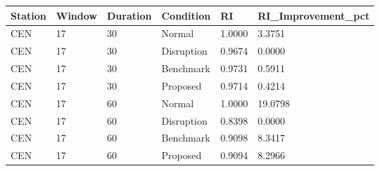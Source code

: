 \begin{tabular}{llllll}
\toprule
Station & Window & Duration & Condition & RI & RI\_Improvement\_pct \\
\midrule
CEN & 17 & 30 & Normal & 1.0000 & 3.3751 \\
CEN & 17 & 30 & Disruption & 0.9674 & 0.0000 \\
CEN & 17 & 30 & Benchmark & 0.9731 & 0.5911 \\
CEN & 17 & 30 & Proposed & 0.9714 & 0.4214 \\
CEN & 17 & 60 & Normal & 1.0000 & 19.0798 \\
CEN & 17 & 60 & Disruption & 0.8398 & 0.0000 \\
CEN & 17 & 60 & Benchmark & 0.9098 & 8.3417 \\
CEN & 17 & 60 & Proposed & 0.9094 & 8.2966 \\
\bottomrule
\end{tabular}
